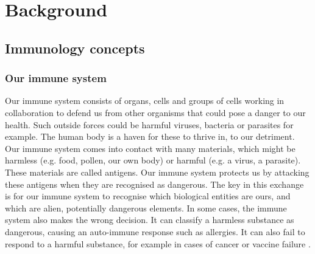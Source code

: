 \chapter{Background}

\section{Immunology concepts}

\subsection{Our immune system} \label{bg:immunesystem}

Our immune system consists of organs, cells and groups of cells working in collaboration to defend us from other organisms that could pose a danger to our health. Such outside forces could be harmful viruses, bacteria or parasites for example. The human body is a haven for these to thrive in, to our detriment. Our immune system comes into contact with many materials, which might be harmless (e.g. food, pollen, our own body) or harmful (e.g. a virus, a parasite). These materials are called antigens. Our immune system protects us by attacking these antigens when they are recognised as dangerous. The key in this exchange is for our immune system to recognise which biological entities are ours, and which are alien, potentially dangerous elements. In some cases, the immune system also makes the wrong decision. It can classify a harmless substance as dangerous, causing an auto-immune response such as allergies. It can also fail to respond to a harmful substance, for example in cases of cancer or vaccine failure \citep{bsi_2020}.

